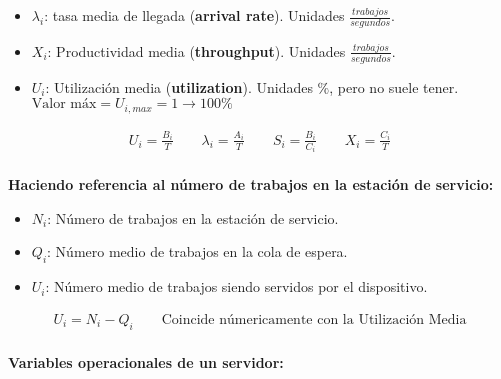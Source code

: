 \documentclass[a4paper,12pt]{article}
\begin{document}
\begin{itemize}
    \item $\lambda_i$: tasa media de llegada (\textbf{arrival rate}). Unidades $\frac{trabajos}{segundos}$.
    \item $X_i$: Productividad media (\textbf{throughput}). Unidades $\frac{trabajos}{segundos}$.
    \item $U_i$: Utilización media (\textbf{utilization}). Unidades $\%$, pero no suele tener. $\text{Valor máx} = U_{i,max} = 1 \rightarrow 100 \%$
\end{itemize}

\begin{tcolorbox}[colback=yellow!5!white, colframe=yellow!75!black]
    \begin{align*}
        U_i = \frac{B_i}{T} \quad \quad \lambda_i = \frac{A_i}{T} \quad \quad S_i = \frac{B_i}{C_i} \quad \quad X_i = \frac{C_i}{T} \\
    \end{align*}
\end{tcolorbox}

\textbf{Haciendo referencia al número de trabajos en la estación de servicio:}
\begin{itemize}
    \item $N_i$: Número de trabajos en la estación de servicio.
    \item $Q_i$: Número medio de trabajos en la cola de espera.
    \item $U_i$: Número medio de trabajos siendo servidos por el 
    dispositivo.
\end{itemize}

\begin{tcolorbox}[colback=yellow!5!white, colframe=yellow!75!black]
    \begin{align*}
        U_i = N_i - Q_i \quad \quad \text{Coincide númericamente con la Utilización Media}\\
    \end{align*}
\end{tcolorbox}

\textbf{Variables operacionales de un servidor:}
\end{document}
